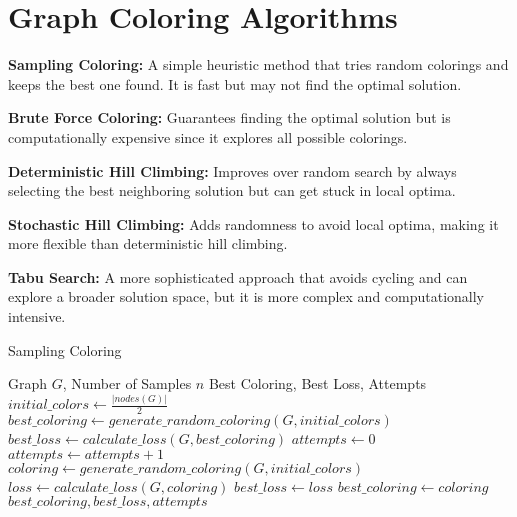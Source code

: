 \documentclass{article}
\begin{document}
\section*{Graph Coloring Algorithms}

\textbf{Sampling Coloring:} A simple heuristic method that tries random colorings and keeps the best one found. It is fast but may not find the optimal solution.

\textbf{Brute Force Coloring:} Guarantees finding the optimal solution but is computationally expensive since it explores all possible colorings.

\textbf{Deterministic Hill Climbing:} Improves over random search by always selecting the best neighboring solution but can get stuck in local optima.

\textbf{Stochastic Hill Climbing:} Adds randomness to avoid local optima, making it more flexible than deterministic hill climbing.

\textbf{Tabu Search:} A more sophisticated approach that avoids cycling and can explore a broader solution space, but it is more complex and computationally intensive.


\begin{algorithm}
\caption{Sampling Coloring}
\begin{algorithmic}[1]
\REQUIRE Graph $G$, Number of Samples $n$
\ENSURE Best Coloring, Best Loss, Attempts
\STATE $initial\_colors \gets \frac{|nodes(G)|}{2}$
\STATE $best\_coloring \gets generate\_random\_coloring(G, initial\_colors)$
\STATE $best\_loss \gets calculate\_loss(G, best\_coloring)$
\STATE $attempts \gets 0$
    \STATE $attempts \gets attempts + 1$
    \STATE $coloring \gets generate\_random\_coloring(G, initial\_colors)$
    \STATE $loss \gets calculate\_loss(G, coloring)$
        \STATE $best\_loss \gets loss$
        \STATE $best\_coloring \gets coloring$
    \ENDIF
\ENDFOR
\RETURN $best\_coloring, best\_loss, attempts$
\end{algorithmic}
\end{algorithm}
\end{document}
